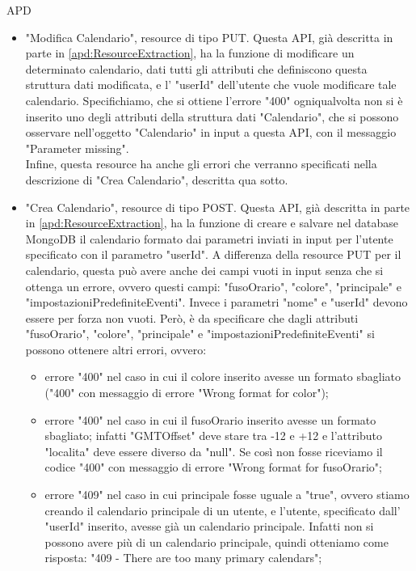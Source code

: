 \begin{listaPersonale} {APD}
\begin{listaPersonale2}[APD]{}
\begin{listaPersonale3}[APD]{}
\begin{itemize}
                \item "Modifica Calendario", resource di tipo PUT. Questa API, già descritta in parte in \ref{apd:ResourceExtraction}, ha la funzione di modificare un determinato calendario, dati tutti gli attributi che definiscono questa struttura dati modificata, e l' "userId" dell'utente che vuole modificare tale calendario. Specifichiamo, che si ottiene l'errore "400" ogniqualvolta non si è inserito uno degli attributi della struttura dati "Calendario", che si possono osservare nell'oggetto "Calendario" in input a questa API, con il messaggio "Parameter missing". \\
                      Infine, questa resource ha anche gli errori che verranno specificati nella descrizione di "Crea Calendario", descritta qua sotto.
                \item "Crea Calendario", resource di tipo POST. Questa API, già descritta in parte in \ref{apd:ResourceExtraction}, ha la funzione di creare e salvare nel database MongoDB il calendario formato dai parametri inviati in input per l'utente specificato con il parametro "userId". A differenza della resource PUT per il calendario, questa può avere anche dei campi vuoti in input senza che si ottenga un errore, ovvero questi campi: "fusoOrario", "colore", "principale" e "impostazioniPredefiniteEventi". Invece i parametri "nome" e "userId" devono essere per forza non vuoti. Però, è da specificare che dagli attributi "fusoOrario", "colore", "principale" e "impostazioniPredefiniteEventi" si possono ottenere altri errori, ovvero:
                      \begin{itemize}
                          \item errore "400" nel caso in cui il colore inserito avesse un formato sbagliato ("400" con messaggio di errore "Wrong format for color");
                          \item errore "400" nel caso in cui il fusoOrario inserito avesse un formato sbagliato; infatti "GMTOffset" deve stare tra -12 e +12 e l'attributo "localita" deve essere diverso da "null". Se così non fosse riceviamo il codice "400" con messaggio di errore "Wrong format for fusoOrario";
                          \item errore "409" nel caso in cui principale fosse uguale a "true", ovvero stiamo creando il calendario principale di un utente, e l'utente, specificato dall' "userId" inserito, avesse già un calendario principale. Infatti non si possono avere più di un calendario principale, quindi otteniamo come risposta: "409 - There are too many primary calendars";

\end{itemize}
\end{itemize}
\end{listaPersonale3}
\end{listaPersonale2}
\end{listaPersonale}
